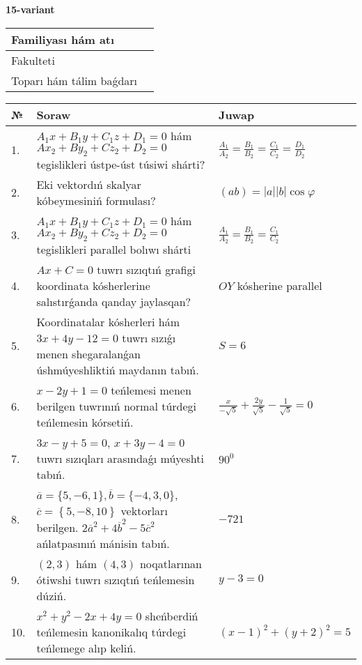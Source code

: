 \documentclass{article}
\begin{document}
\egroup

\newpage


\textbf{15-variant}\\

\bgroup
\def\arraystretch{1.6} %

\begin{tabular}{|m{5.7cm}|m{9.5cm}|}
\hline
Familiyası hám atı & \\
\hline
Fakulteti  & \\
\hline
Toparı hám tálim baǵdarı  & \\
\hline
\end{tabular}

\vspace{1cm}

\begin{tabular}{|m{0.7cm}|m{10cm}|m{4cm}|}
\hline
№ & Soraw & Juwap \\
\hline
1. & $A_1x+B_1y+C_1z+D_1=0$ hám $Ax_2+By_2+Cz_2+D_2=0$ tegislikleri ústpe-úst túsiwi shárti? & $\frac{A_1}{A_2}=\frac{B_1}{B_2}=\frac{C_1}{C_2}=\frac{D_1}{D_2}$ \\
\hline
2. & Eki vektordıń skalyar kóbeymesiniń formulası? & $(ab)=|a||b|\cos\varphi$ \\
\hline
3. & $A_1x+B_1y+C_1z+D_1=0$ hám $Ax_2+By_2+Cz_2+D_2=0$ tegislikleri parallel bolıwı shárti & $\frac{A_1}{A_2}=\frac{B_1}{B_2}=\frac{C_1}{C_2}$ \\
\hline
4. & $Ax+C=0$ tuwrı sızıqtıń grafigi koordinata kósherlerine salıstırǵanda qanday jaylasqan? & $OY$ kósherine parallel \\
\hline
5. & Koordinatalar kósherleri hám $ 3x+4y-12=0 $ tuwrı sızıǵı menen shegaralanǵan úshmúyeshliktiń maydanın tabıń. & $ S=6 $ \\
\hline
6. & $x-2y+1=0$ teńlemesi menen berilgen tuwrınıń normal túrdegi teńlemesin kórsetiń. & $\frac{x}{- \sqrt{5}}+\frac{2y}{\sqrt{5}}-\frac{1}{\sqrt{5}}=0$ \\
\hline
7. & $3x-y+5=0$, $x+3y-4=0$ tuwrı sızıqları arasındaǵı múyeshti tabıń. & $90^{0}$ \\
\hline
8. & $\overline{a}=\{5,-6, 1 \}, \overline{b}=\{-4, 3, 0 \} $, $\overline{c}=\left\{ 5,-8, 10 \right\}$ vektorları berilgen. $2{\overline{a}}^{2}+4{\overline{b}}^{2}-5{\overline{c}}^{2}$ ańlatpasınıń mánisin tabıń. & $-721$ \\
\hline
9. & $(2, 3)$ hám $(4, 3)$ noqatlarınan ótiwshi tuwrı sızıqtıń teńlemesin dúziń. & $ y-3=0$ \\
\hline
10. & $x^{2}+y^{2}-2x+4y=0$ sheńberdiń teńlemesin kanonikalıq túrdegi teńlemege alıp keliń. & $(x-1)^{2}+(y+2)^{2}=5$ \\
\hline
\end{tabular}
\end{document}
